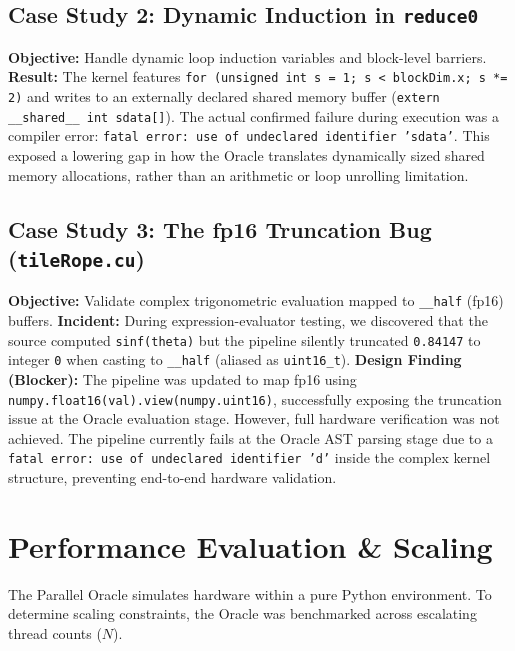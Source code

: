 \documentclass[10pt, conference, compsocconf]{IEEEtran}
\begin{document}
\subsection{Case Study 2: Dynamic Induction in \texttt{reduce0}}
\textbf{Objective:} Handle dynamic loop induction variables and block-level barriers.
\textbf{Result:} The kernel features \texttt{for (unsigned int s = 1; s < blockDim.x; s *= 2)} and writes to an externally declared shared memory buffer (\texttt{extern \_\_shared\_\_ int sdata[]}). The actual confirmed failure during execution was a compiler error: \texttt{fatal error: use of undeclared identifier 'sdata'}. This exposed a lowering gap in how the Oracle translates dynamically sized shared memory allocations, rather than an arithmetic or loop unrolling limitation.

\subsection{Case Study 3: The fp16 Truncation Bug (\texttt{tileRope.cu})}
\textbf{Objective:} Validate complex trigonometric evaluation mapped to \texttt{\_\_half} (fp16) buffers.
\textbf{Incident:} During expression-evaluator testing, we discovered that the source computed \texttt{sinf(theta)} but the pipeline silently truncated \texttt{0.84147} to integer \texttt{0} when casting to \texttt{\_\_half} (aliased as \texttt{uint16\_t}).
\textbf{Design Finding (Blocker):} The pipeline was updated to map fp16 using \texttt{numpy.float16(val).view(numpy.uint16)}, successfully exposing the truncation issue at the Oracle evaluation stage. However, full hardware verification was not achieved. The pipeline currently fails at the Oracle AST parsing stage due to a \texttt{fatal error: use of undeclared identifier 'd'} inside the complex kernel structure, preventing end-to-end hardware validation.

\section{Performance Evaluation \& Scaling}
The Parallel Oracle simulates hardware within a pure Python environment. To determine scaling constraints, the Oracle was benchmarked across escalating thread counts ($N$).
\end{document}

